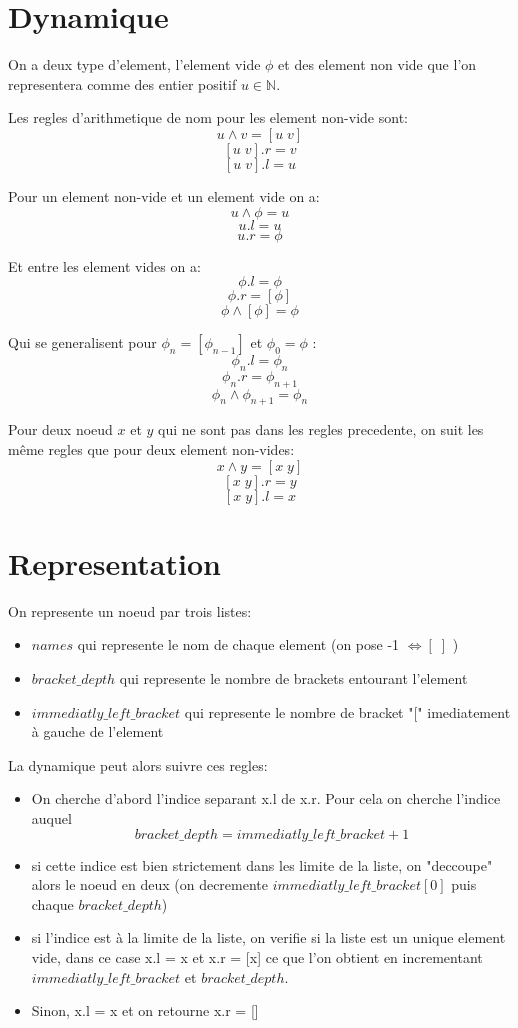 \documentclass[]{article}
\newcommand{\N}{\mathbb{N}}
\begin{document}
\section{Dynamique}

On a deux type d'element, l'element vide $\phi$ et des element non vide que l'on representera comme des entier positif $u \in \N$.

\noindent Les regles d'arithmetique de nom pour les element non-vide sont:
\[ u \wedge v = \left[ u \; v \right] \] 
\[ \left[ u \; v \right].r = v \] 
\[ \left[ u \; v \right].l = u \]

\noindent Pour un element non-vide et un element vide on a:
\[ u \wedge \phi = u \]
\[ u.l = u \] 
\[ u.r = \phi \]

\noindent Et entre les element vides on a:
\[ \phi.l = \phi \]
\[ \phi.r = \left[\phi \right]\]
\[ \phi \wedge \left[\phi \right] = \phi\]

\noindent Qui se generalisent pour $\phi_n = \left[\phi_{n - 1}\right]$ et $\phi_0 = \phi$ :
\[ \phi_n.l = \phi_n \]
\[ \phi_n.r = \phi_{n + 1}\]
\[ \phi_n \wedge \phi_{n + 1} = \phi_n\]

\noindent Pour deux noeud $x$ et $y$ qui ne sont pas dans les regles precedente, on suit les même regles que pour deux element non-vides:
\[ x \wedge y = \left[ x \; y \right] \] 
\[ \left[ x \; y \right].r = y \] 
\[ \left[ x \; y \right].l = x \]

\section{Representation}

On represente un noeud par trois listes:
\begin{itemize}
	\item $names$ qui represente le nom de chaque element (on pose -1 $ \Leftrightarrow \left[ \; \right] $ )
	\item $bracket\_depth$ qui represente le nombre de brackets entourant l'element
	\item $immediatly\_left\_bracket $ qui represente le nombre de bracket "{[}" imediatement à gauche de l'element
\end{itemize}

\noindent La dynamique peut alors suivre ces regles:

\begin{itemize}
	\item On cherche d'abord l'indice separant x.l de x.r. Pour cela on cherche l'indice auquel 
	\[ bracket\_depth = immediatly\_left\_bracket + 1 \]
	\item si cette indice est bien strictement dans les limite de la liste, on "deccoupe" alors le noeud en deux (on decremente $ immediatly\_left\_bracket\left[0\right] $ puis chaque $ bracket\_depth$)
	\item si l'indice est à la limite de la liste, on verifie si la liste est un unique element vide, dans ce case x.l = x et x.r = {[x]} ce que l'on obtient en incrementant $ immediatly\_left\_bracket $ et $ bracket\_depth $.
	\item Sinon, x.l = x et on retourne x.r = {[\;]}
\end{itemize}
\end{document}
